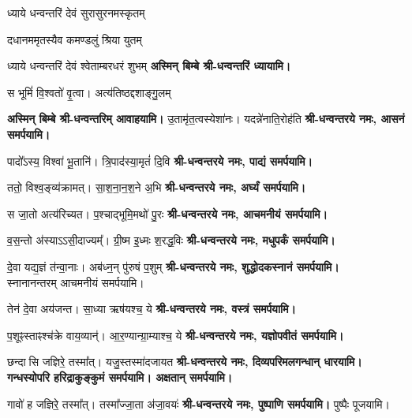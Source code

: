 \renewcommand{\devAya}{श्री-धन्वन्तरये नमः,}
\begin{center}

{ध्याये धन्वन्तरिं देवं सुरासुरनमस्कृतम्}

{दधानममृतस्यैव कमण्डलुं श्रिया युतम्}

{ध्याये धन्वन्तरिं देवं श्वेताम्बरधरं शुभम्}
\textbf{अस्मिन् बिम्बे श्री-धन्वन्तरिं ध्यायामि।}
\medskip

{स भूमिं॑ वि॒श्वतो॑ वृ॒त्वा। अत्य॑तिष्ठद्दशाङ्गु॒लम्}

\textbf{अस्मिन् बिम्बे श्री-धन्वन्तरिम् आवाहयामि।}
\medskip
{}
{उ॒तामृ॑त॒त्वस्येशा॑नः। यदन्ने॑नाति॒रोह॑ति}
\textbf{\devAya{} आसनं समर्पयामि।}\medskip

{पादो᳚ऽस्य॒ विश्वा॑ भू॒तानि॑। त्रि॒पाद॑स्या॒मृतं॑ दि॒वि}
\textbf{\devAya{} पाद्यं समर्पयामि।}\medskip

{ततो॒ विश्व॒ङ्व्य॑क्रामत्। सा॒श॒ना॒न॒श॒ने अ॒भि}
\textbf{\devAya{} अर्घ्यं समर्पयामि।}\medskip

{स जा॒तो अत्य॑रिच्यत। प॒श्चाद्भूमि॒मथो॑ पु॒रः}
\textbf{\devAya{} आचमनीयं समर्पयामि।}\medskip

{व॒स॒न्तो अ॑स्याऽऽसी॒दाज्यम्᳚। ग्री॒ष्म इ॒ध्मः श॒रद्ध॒विः}
\textbf{\devAya{} मधुपर्कं समर्पयामि।}\medskip

{दे॒वा यद्य॒ज्ञं त॑न्वा॒नाः। अब॑ध्न॒न् पु॑रुषं प॒शुम्}
\textbf{\devAya{} शुद्धोदकस्नानं समर्पयामि। }\\
स्नानानन्तरम् आचमनीयं समर्पयामि।\medskip

{तेन॑ दे॒वा अय॑जन्त। सा॒ध्या ऋष॑यश्च॒ ये}
\textbf{\devAya{} वस्त्रं समर्पयामि।}\medskip

{प॒शूꣴस्ताꣴश्च॑क्रे वाय॒व्यान्॑। आ॒र॒ण्यान्ग्रा॒म्याश्च॒ ये}
\textbf{\devAya{} यज्ञोपवीतं समर्पयामि।}\medskip

{छन्दासि जज्ञिरे॒ तस्मा᳚त्। यजु॒स्तस्मा॑दजायत}
\textbf{\devAya{} दिव्यपरिमलगन्धान् धारयामि।\\
गन्धस्योपरि हरिद्राकुङ्कुमं समर्पयामि। अक्षतान् समर्पयामि।}\medskip

{गावो॑ ह जज्ञिरे॒ तस्मा᳚त्। तस्मा᳚ज्जा॒ता अ॑जा॒वयः॑}
\textbf{\devAya{} पुष्पाणि समर्पयामि। } पुष्पैः पूजयामि।
\medskip

\end{center}

